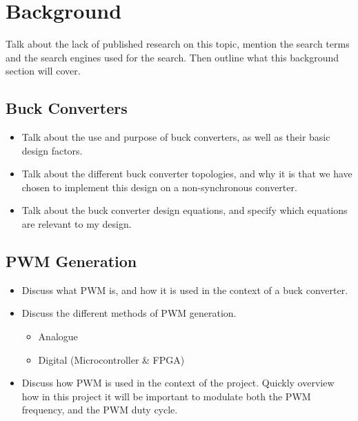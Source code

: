 \chapter{Background}\label{C:background}

Talk about the lack of published research on this topic, mention the search terms and the search engines used for the search. Then outline what this background section will cover.

\section{Buck Converters}

\begin{itemize}

    \item 
    Talk about the use and purpose of buck converters, as well as their basic design factors.

    \item 
    Talk about the different buck converter topologies, and why it is that we have chosen to implement this design on a non-synchronous converter. 

    \item 
    Talk about the buck converter design equations, and specify which equations are relevant to my design.

\end{itemize}



\section{PWM Generation}

\begin{itemize}

    \item 
    Discuss what PWM is, and how it is used in the context of a buck converter.
    
    \item 
    Discuss the different methods of PWM generation. 

    \begin{itemize}
        \item Analogue 
        \item Digital (Microcontroller \& FPGA)
    \end{itemize}

    \item 
    Discuss how PWM is used in the context of the project. Quickly overview how in this project it will be important to modulate both the PWM frequency, and the PWM duty cycle.

\end{itemize}

